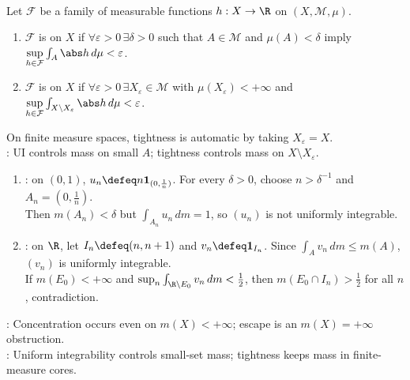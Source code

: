 \begin{definition} \label{def:l1-uniform-integrability-and-tightness} \\
Let $\mathcal{F}$ be a family of measurable functions $h:X\to\R$ on $(X,\mathcal{M},\mu)$.
\begin{enumerate}[label=(\roman*)]
\setlength{\itemsep}{0pt}
\item $\mathcal{F}$ is  on $X$ if $\forall\varepsilon>0\,\exists\delta>0$ such that $A\in\mathcal{M}$ and $\mu(A)<\delta$ imply $\sup\limits_{h\in\mathcal{F}}\int_A\abs h\,d\mu<\varepsilon$.
\item $\mathcal{F}$ is  on $X$ if $\forall\varepsilon>0\,\exists X_\varepsilon\in\mathcal{M}$ with $\mu(X_\varepsilon)<+\infty$ and $\sup\limits_{h\in\mathcal{F}}\int_{X\setminus X_\varepsilon}\abs h\,d\mu<\varepsilon$.
\end{enumerate}
On finite measure spaces, tightness is automatic by taking $X_\varepsilon=X$.\\
: UI controls mass on small $A$; tightness controls mass on $X\setminus X_\varepsilon$.
\end{definition}

\begin{example} \label{ex:uniform-integrability-tightness-obstructions} 
\begin{enumerate}[label=(\roman*)]
\setlength{\itemsep}{0pt}
\item {}: on $(0,1)$, $u_n\defeq n\mathbf{1}_{(0,\frac{1}{n})}$. For every $\delta>0$, choose $n>\delta^{-1}$ and $A_n=(0,\frac{1}{n})$.\\
Then $m(A_n)<\delta$ but $\int_{A_n}u_n\,dm=1$, so $(u_n)$ is not uniformly integrable.
\item {}: on $\R$, let $I_n\defeq(n,n+1)$ and $v_n\defeq\mathbf{1}_{I_n}$. Since $\int_Av_n\,dm\leq m(A)$, $(v_n)$ is uniformly integrable.\\
If $m(E_0)<+\infty$ and $\sup_n\int_{\R\setminus E_0}v_n\,dm<\frac{1}{2}$, then $m(E_0\cap I_n)>\frac{1}{2}$ for all $n$, contradiction.
\end{enumerate}
: Concentration occurs even on $m(X)<+\infty$; escape is an $m(X)=+\infty$ obstruction.\\
: Uniform integrability controls small-set mass; tightness keeps mass in finite-measure cores.
\end{example}

